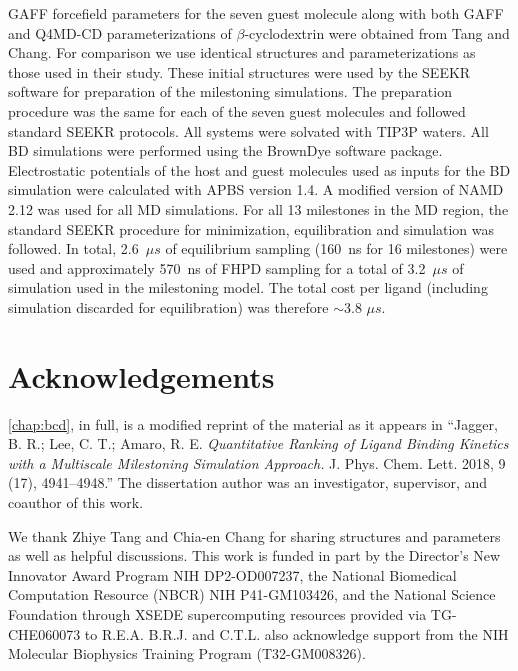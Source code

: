 \par GAFF\cite{Wang2004,Wang2006} forcefield parameters for the seven guest molecule
along with both GAFF and Q4MD-CD\cite{Cezard2011} parameterizations of $\beta$-cyclodextrin
were obtained from Tang and Chang\cite{Tang2017}. For comparison we use identical structures and
parameterizations as those used in their study. These initial structures were
used by the SEEKR software for preparation of the milestoning simulations.
The preparation procedure was the same for each of the seven guest molecules and
followed standard SEEKR protocols\cite{Votapka2017}. All systems were solvated
with TIP3P waters\cite{Jorgensen1983a}. All BD simulations were performed using the BrownDye software package\cite{Huber2010}.
Electrostatic potentials of the host and guest molecules used as inputs for the
BD simulation were calculated with APBS version 1.4\cite{Baker2001}.
A modified version of NAMD 2.12 was used for all MD simulations\cite{Phillips2005}.
For all 13 milestones in the MD region, the standard SEEKR procedure for
minimization, equilibration and simulation was followed. In total, 2.6~${\mu}s$ of equilibrium sampling (160~ns for 16 milestones) were
used and approximately 570~ns of FHPD sampling for a total of 3.2~${\mu}s$ of
simulation used in the milestoning model. The total cost per ligand (including
simulation discarded for equilibration) was therefore $\sim$3.8 ${\mu}s$.

\section{Acknowledgements}
\par \cref{chap:bcd}, in full, is a modified reprint of the material as it appears in ``Jagger, B. R.; Lee, C. T.; Amaro, R. E. \emph{Quantitative Ranking of Ligand Binding Kinetics with a Multiscale Milestoning Simulation Approach.} J. Phys. Chem. Lett. 2018, 9 (17), 4941–4948.''
The dissertation author was an investigator, supervisor, and coauthor of this work.

\par We thank Zhiye Tang and Chia-en Chang for sharing structures and parameters as
well as helpful discussions. This work is funded in part by the Director's
New Innovator Award Program NIH DP2-OD007237, the National Biomedical Computation
Resource (NBCR) NIH P41-GM103426, and the National Science Foundation through
XSEDE supercomputing resources provided via TG-CHE060073 to R.E.A. B.R.J.
and C.T.L. also acknowledge support from the NIH Molecular Biophysics
Training Program (T32-GM008326).